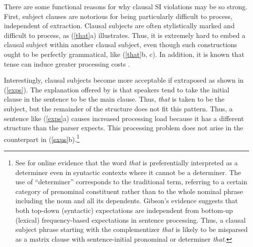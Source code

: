 \documentclass[output=paper,biblatex,babelshorthands,newtxmath,draftmode,colorlinks,citecolor=brown]{langscibook}
\begin{document}
\eal \label{ssc}

\zl

%



There are some functional reasons for why clausal SI violations may be so strong. First, subject
clauses are notorious for being particularly difficult to process, independent of
extraction. Clausal subjects are often stylistically marked and difficult to process, as
(\ref{that}a) illustrates. Thus, it is extremely hard to embed a clausal subject within another
clausal subject, even though such constructions ought to be perfectly grammatical, like
(\ref{that}b, c). In addition, it is known that tense can induce greater processing costs
\citep{kluender92,gibson0000}.

\eal  \label{that}

 
\zl


\noindent
Interestingly, clausal subjects become more acceptable if extraposed as shown in (\ref{exps}).  The
explanation offered by \citet[356--357]{fod74} is that speakers tend to take the initial clause in
the sentence to be the main clause. Thus, \emph{that} is taken to be the subject, but the remainder
of the structure does not fit this pattern. Thus, a sentence like (\ref{exps}a) causes increased
processing load because it has a different structure than the parser expects.  This processing
problem does not arise in the counterpart in (\ref{exps}b).\footnote{See \citet{gibson07} for online
  evidence that the word \emph{that} is preferentially interpreted as a determiner even in syntactic
  contexts where it cannot be a determiner. The use of ``determiner'' corresponds to the traditional
  term, referring to a certain category of prenominal constituent rather than to the whole nominal
  phrase including the noun and all its dependents.  Gibson's evidence suggests that both top-down
  (syntactic) expectations are independent from bottom-up (lexical) frequency-based expectations in
  sentence processing. Thus, a clausal subject phrase starting with the complementizer \emph{that}
  is likely to be misparsed as a matrix clause with sentence-initial pronominal or determiner
  \emph{that}.}
\end{document}
